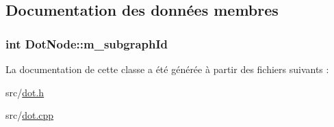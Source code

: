 \subsection{Documentation des données membres}
\hypertarget{class_dot_node_afa257c0a638d14c60ba4714df5a9845b}{}
\subsubsection[{m\+\_\+subgraph\+Id}]{\setlength{\rightskip}{0pt plus 5cm}int Dot\+Node\+::m\+\_\+subgraph\+Id}\label{class_dot_node_afa257c0a638d14c60ba4714df5a9845b}


La documentation de cette classe a été générée à partir des fichiers suivants \+:\begin{DoxyCompactItemize}
\item 
src/\hyperlink{dot_8h}{dot.\+h}\item 
src/\hyperlink{dot_8cpp}{dot.\+cpp}\end{DoxyCompactItemize}
